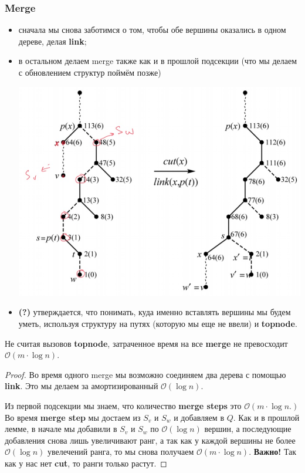 \subsubsection{Merge}
\begin{itemize}
    \item сначала мы снова заботимся о том, чтобы обе вершины оказались в одном дереве, делая \textbf{link};
    \item в остальном делаем merge также как и в прошлой подсекции (что мы делаем с обновлением структур поймём позже)
    \begin{center}
        \includegraphics[scale = 0.6]{new_merge.jpg}
    \end{center}
    \item \textbf{(?)} утверждается, что понимать, куда именно вставлять вершины мы будем уметь, используя структуру на путях (которую мы еще не ввели) и \textbf{topnode}.
    
\end{itemize}
\begin{lemma}
Не считая вызовов \textbf{topnode}, затраченное время на все \textbf{merge} не превосходит $\mathcal{O}(m\cdot\log{n}).$
\end{lemma}
\begin{proof}
Во время одного merge мы возможно соединяем два дерева с помощью \textbf{link}. Это мы делаем за амортизированный $\mathcal{O}(\log{n}).$ 

Из первой подсекции мы знаем, что количество \textbf{merge steps} это $\mathcal{O}(m\cdot\log{n}.)$ Во время \textbf{merge step} мы достаем из $S_v$ и $S_w$ и добавляем в $Q.$ Как и в прошлой лемме, в начале мы добавили в $S_v$ и $S_w$ по $\mathcal{O}(\log{n})$ вершин, а последующие добавления снова лишь увеличивают ранг, а так как у каждой вершины не более $\mathcal{O}(\log{n})$ увелечений ранга, то мы снова получаем $\mathcal{O}(m\cdot\log{n}).$ \textbf{Важно!} Так как у нас нет \textbf{cut}, то ранги только растут.

\end{proof}
